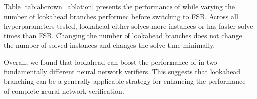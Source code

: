 \documentclass{article}
\begin{document}
\begin{table}[t]
    \centering
    \setlength{\tabcolsep}{2pt}
    \renewcommand{\arraystretch}{1.2}
    \caption{\abcrown results with varying number of lookahead branches. LH denotes lookahead. Time is in seconds.}
    \label{tab:abcrown_ablation}
\end{table}

Table \ref{tab:abcrown_ablation} presents the performance of \abcrown while varying the number of lookahead branches performed before switching to FSB. Across all hyperparameters tested, lookahead either solves more instances or has faster solve times than FSB. Changing the number of lookahead branches does not change the number of solved instances and changes the solve time minimally.

Overall, we found that lookahead can boost the performance of \bab in two fundamentally different neural network verifiers. This suggests that lookahead branching can be a generally applicable strategy for enhancing the performance of complete neural network verification.
\end{document}
